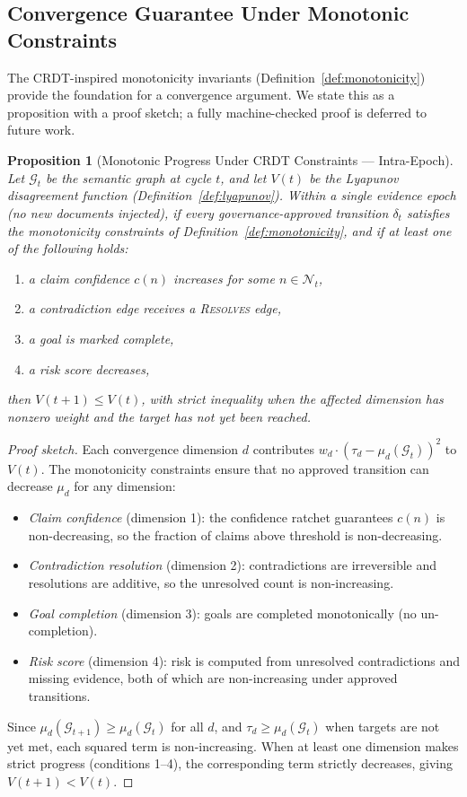 \documentclass[11pt]{article}
\newtheorem{proposition}{Proposition}
\begin{document}
\subsection{Convergence Guarantee Under Monotonic Constraints}

The CRDT-inspired monotonicity invariants (Definition~\ref{def:monotonicity}) provide the foundation for a convergence argument. We state this as a proposition with a proof sketch; a fully machine-checked proof is deferred to future work.

\begin{proposition}[Monotonic Progress Under CRDT Constraints --- Intra-Epoch]
\label{prop:monotonic}
Let $\mathcal{G}_t$ be the semantic graph at cycle $t$, and let $V(t)$ be the Lyapunov disagreement function (Definition~\ref{def:lyapunov}). \emph{Within a single evidence epoch} (no new documents injected), if every governance-approved transition $\delta_t$ satisfies the monotonicity constraints of Definition~\ref{def:monotonicity}, and if at least one of the following holds:
\begin{enumerate}
  \item a claim confidence $c(n)$ increases for some $n \in \mathcal{N}_t$,
  \item a contradiction edge receives a \textnormal{\textsc{Resolves}} edge,
  \item a goal is marked complete,
  \item a risk score decreases,
\end{enumerate}
then $V(t+1) \leq V(t)$, with strict inequality when the affected dimension has nonzero weight and the target has not yet been reached.
\end{proposition}

\begin{proof}[Proof sketch]
Each convergence dimension $d$ contributes $w_d \cdot (\tau_d - \mu_d(\mathcal{G}_t))^2$ to $V(t)$. The monotonicity constraints ensure that no approved transition can decrease $\mu_d$ for any dimension:
\begin{itemize}
  \item \emph{Claim confidence} (dimension 1): the confidence ratchet guarantees $c(n)$ is non-decreasing, so the fraction of claims above threshold is non-decreasing.
  \item \emph{Contradiction resolution} (dimension 2): contradictions are irreversible and resolutions are additive, so the unresolved count is non-increasing.
  \item \emph{Goal completion} (dimension 3): goals are completed monotonically (no un-completion).
  \item \emph{Risk score} (dimension 4): risk is computed from unresolved contradictions and missing evidence, both of which are non-increasing under approved transitions.
\end{itemize}
Since $\mu_d(\mathcal{G}_{t+1}) \geq \mu_d(\mathcal{G}_t)$ for all $d$, and $\tau_d \geq \mu_d(\mathcal{G}_t)$ when targets are not yet met, each squared term is non-increasing. When at least one dimension makes strict progress (conditions 1--4), the corresponding term strictly decreases, giving $V(t+1) < V(t)$.
\end{proof}
\end{document}
